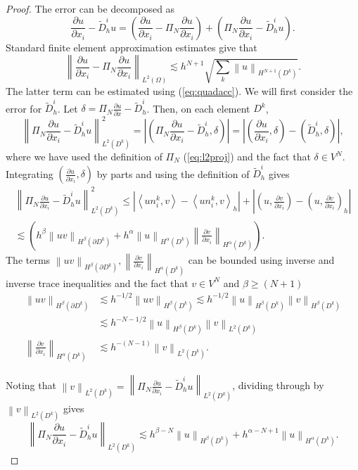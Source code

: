 \documentclass{svjour3}                     %
\renewcommand{\tilde}{\widetilde}
\newcommand{\pd}[2]{\frac{\partial#1}{\partial#2}}
\newcommand{\nor}[1]{\left\| #1 \right\|}
\newcommand{\LRp}[1]{\left( #1 \right)}
\newcommand{\LRa}[1]{\left\langle #1 \right\rangle}
\newcommand{\LRb}[1]{\left| #1 \right|}
\renewcommand{\note}[1]{{\color{blue}{#1}}}
\begin{document}
\begin{proof}
The error can be decomposed as
\[
\pd{u}{x_i} - \tilde{D}^i_h u = \LRp{\pd{u}{x_i} - \Pi_N\pd{u}{x_i}} + \LRp{\Pi_N\pd{u}{x_i} - \tilde{D}^i_h u}.
\]
Standard finite element approximation estimates \cite{brenner2007mathematical} give that 
\[
\nor{\pd{u}{x_i} - \Pi_N\pd{u}{x_i}}_{L^2\LRp{\Omega}} \lesssim h^{N+1} \sqrt{\sum_k \nor{u}_{H^{N+1}\LRp{D^k}}}.
\]
The latter term can be estimated using (\ref{eq:quadacc}).  We will first consider the error for $\tilde{D}^i_h$.  Let $\delta = \Pi_N\pd{u}{x} - \tilde{D}^i_h$.  Then, on each element $D^k$, 
\[
\nor{\Pi_N\pd{u}{x_i} - \tilde{D}^i_hu}_{L^2\LRp{D^k}}^2 = \LRb{\LRp{\Pi_N\pd{u}{x_i} - \tilde{D}^i_h,\delta} } = \LRb{\LRp{\pd{u}{x_i}, \delta} - \LRp{\tilde{D}^i_h,\delta} },
\]
where we have used the definition of $\Pi_N$ (\ref{eq:l2proj}) and the fact that $\delta \in V^N$.  Integrating $\LRp{\pd{u}{x_i}, \delta}$ by parts and using the definition of $\tilde{D}^i_h$ gives
\begin{gather*}
\nor{\Pi_N\pd{u}{x_i} - \tilde{D}^i_hu}_{L^2\LRp{D^k}}^2 \leq  \LRb{\LRa{u n^k_i, v}- \LRa{un^k_i, v}_h} + \LRb{\LRp{u, \pd{v}{x_i}} - \LRp{u, \pd{v}{x_i}}_h}\\
\lesssim \LRp{h^{\beta}\nor{uv}_{H^{\beta}\LRp{\partial D^k}} +  h^{\alpha}\nor{u}_{H^{\alpha}\LRp{D^k}} \nor{\pd{v}{x_i}}_{H^{\alpha}\LRp{D^k}}}.
\end{gather*}
The terms $\nor{uv}_{H^{\beta}\LRp{\partial D^k}}, \nor{\pd{v}{x_i}}_{H^{\alpha}\LRp{D^k}}$ can be bounded using inverse and inverse trace inequalities \cite{brenner2007mathematical, chan2018discretely} and the fact that $v \in V^N$ and $\beta \geq (N+1)$
\begin{align*}
\nor{uv}_{H^{\beta}\LRp{\partial D^k}} &\lesssim h^{-1/2} \nor{uv}_{H^{\beta}\LRp{D^k}} \lesssim h^{-1/2} \nor{u}_{H^{\beta}\LRp{D^k}}\nor{v}_{H^{\beta}\LRp{D^k}}\\
&\lesssim h^{-N-1/2} \nor{u}_{H^{\beta}\LRp{D^k}}\nor{v}_{L^2\LRp{D^k}} \\
\nor{\pd{v}{x_i}}_{H^{\alpha}\LRp{D^k}} &\lesssim h^{-(N-1)}\nor{v}_{L^2\LRp{D^k}}.
\end{align*}


Noting that $ \nor{v}_{L^2\LRp{D^k}} = \nor{\Pi_N\pd{u}{x_i} - \tilde{D}^i_hu}_{L^2\LRp{D^k}}$, dividing through by $\nor{v}_{L^2\LRp{D^k}}$ gives
\[
\nor{\Pi_N\pd{u}{x_i} - \tilde{D}^i_hu}_{L^2\LRp{D^k}} \lesssim h^{\beta - N} \nor{u}_{H^{\beta}\LRp{D^k}} + h^{\alpha - N + 1} \nor{u}_{H^{\alpha}\LRp{D^k}}.
\]
 \note{Finish - how to lose extra factor of $1/h$ in trace estimate?}
\end{proof}
\end{document}
